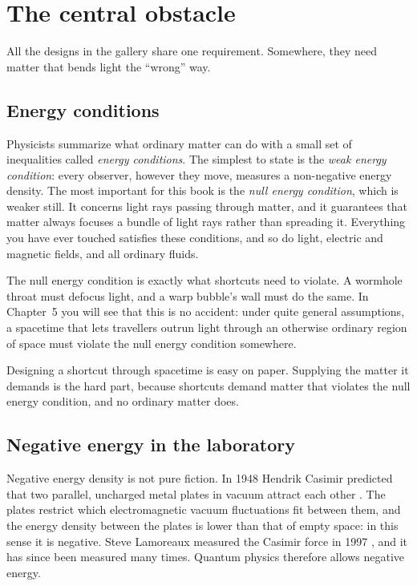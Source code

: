 \section{The central obstacle}\label{sec:obstacle}

All the designs in the gallery share one requirement. Somewhere, they need
matter that bends light the \enquote{wrong} way.

\subsection{Energy conditions}

Physicists summarize what ordinary matter can do with a small set of
inequalities called \emph{energy conditions}. The simplest to state is the
\emph{weak energy condition}: every observer, however they move, measures a
non-negative energy density. The most important for this book is the
\emph{null energy condition}, which is weaker still. It concerns light rays
passing through matter, and it guarantees that matter always focuses a
bundle of light rays rather than spreading it. Everything you have ever
touched satisfies these conditions, and so do light, electric and magnetic
fields, and all ordinary fluids.

The null energy condition is exactly what shortcuts need to violate. A wormhole
throat must defocus light, and a warp bubble's wall must do the same. In
Chapter~5 you will see that this is no accident: under quite general
assumptions, a spacetime that lets travellers outrun light through an otherwise
ordinary region of space must violate the null energy condition somewhere.

\begin{keyidea}
Designing a shortcut through spacetime is easy on paper. Supplying the matter
it demands is the hard part, because shortcuts demand matter that violates the
null energy condition, and no ordinary matter does.
\end{keyidea}

\subsection{Negative energy in the laboratory}

Negative energy density is not pure fiction. In 1948 Hendrik Casimir predicted
that two parallel, uncharged metal plates in vacuum attract each other
\parencite{Casimir1948}. The plates restrict which electromagnetic vacuum
fluctuations fit between them, and the energy density between the plates is
lower than that of empty space: in this sense it is negative. Steve Lamoreaux
measured the Casimir force in 1997 \parencite{Lamoreaux1997}, and it has since
been measured many times. Quantum physics therefore allows negative energy.

